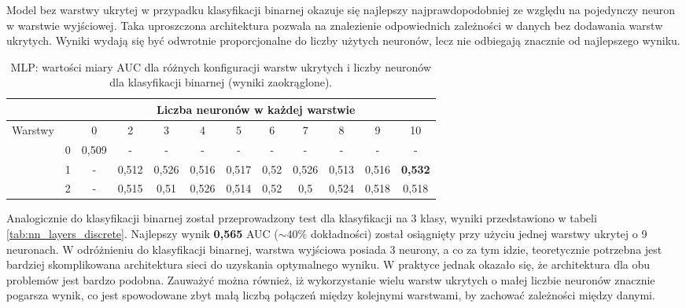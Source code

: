 \documentclass[a4paper, twoside, 11pt, openright]{article}
\begin{document}
Model bez warstwy ukrytej w przypadku klasyfikacji binarnej okazuje się najlepszy najprawdopodobniej ze względu na pojedynczy neuron w warstwie wyjściowej. Taka uproszczona architektura pozwala na znalezienie odpowiednich zależności w danych bez dodawania warstw ukrytych. Wyniki wydają się być odwrotnie proporcjonalne do liczby użytych neuronów, lecz nie odbiegają znacznie od najlepszego wyniku.

\begin{table}[H]
    \centering
    \begin{tabular}{|c|c|c|c|c|c|c|c|c|c|c|c|}
        \hline
         & &  \multicolumn{10}{c|}{Liczba neuronów w każdej warstwie}  \\ \hline
        \multirow{4}{*}{Warstwy} & & 0 & 2 & 3 & 4 & 5 & 6 & 7 & 8 & 9 & 10  \\ \cline{2 - 12}
			& 0 & 0,509 & - & - & - & - & - & - & - & - & - \\ \cline{2 - 12} 
			& 1 & - &  0,512 &  0,526 &  0,516 &  0,517 &  0,52 &  0,526 &  0,513 &  0,516  & \textbf{0,532} \\ \cline{2 - 12} 
			& 2 & - & 0,515 &    0,51 &   0,526 &   0,514 &    0,52 &     0,5 &   0,524 &   0,518 & 0,518 \\ \cline{2 - 12} \hline

    \end{tabular}
    \caption{MLP: wartości miary AUC dla różnych konfiguracji warstw ukrytych i liczby neuronów dla klasyfikacji binarnej (wyniki zaokrąglone).}
    \label{tab:nn_layers_binary}
\end{table}

Analogicznie do klasyfikacji binarnej został przeprowadzony test dla klasyfikacji na 3 klasy, wyniki przedstawiono w tabeli \ref{tab:nn_layers_discrete}. Najlepszy wynik \textbf{0,565} AUC ($\sim 40\%$ dokładności) został osiągnięty przy użyciu jednej warstwy ukrytej o 9 neuronach. W odróżnieniu do klasyfikacji binarnej, warstwa wyjściowa posiada 3 neurony, a co za tym idzie, teoretycznie potrzebna jest bardziej skomplikowana architektura sieci do uzyskania optymalnego wyniku. W praktyce jednak okazało się, że architektura dla obu problemów jest bardzo podobna. Zauważyć można również, iż wykorzystanie wielu warstw ukrytych o małej liczbie neuronów znacznie pogarsza wynik, co jest spowodowane zbyt małą liczbą połączeń między kolejnymi warstwami, by zachować zależności między danymi.
\end{document}
